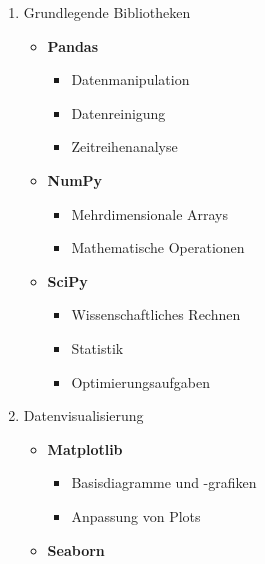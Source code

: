 \documentclass{vorlage-design-main}
\begin{document}
\begin{enumerate}
\def\labelenumi{\arabic{enumi}.}

\item
  Grundlegende Bibliotheken

  \begin{itemize}
  
  \item
    \textbf{Pandas}

    \begin{itemize}
    
    \item
      Datenmanipulation
    \item
      Datenreinigung
    \item
      Zeitreihenanalyse
    \end{itemize}
  \item
    \textbf{NumPy}

    \begin{itemize}
    
    \item
      Mehrdimensionale Arrays
    \item
      Mathematische Operationen
    \end{itemize}
  \item
    \textbf{SciPy}

    \begin{itemize}
    
    \item
      Wissenschaftliches Rechnen
    \item
      Statistik
    \item
      Optimierungsaufgaben
    \end{itemize}
  \end{itemize}
\item
  Datenvisualisierung

  \begin{itemize}
  
  \item
    \textbf{Matplotlib}

    \begin{itemize}
    
    \item
      Basisdiagramme und -grafiken
    \item
      Anpassung von Plots
    \end{itemize}
  \item
    \textbf{Seaborn}

    \begin{itemize}
    

\end{itemize}
\end{itemize}
\end{enumerate}
\end{document}

